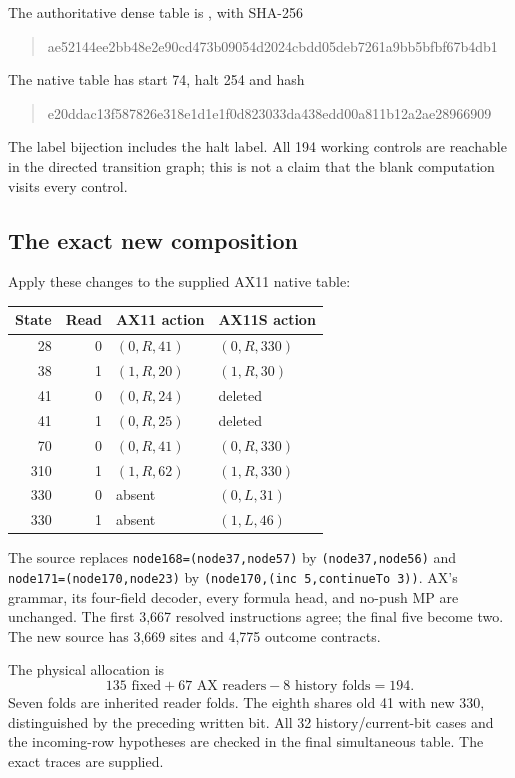 \documentclass[11pt,letterpaper]{article}
\begin{document}
The authoritative dense table is , with SHA-256
\begin{quote}\small\ttfamily
ae52144ee2bb48e2e90cd473b09054d2024cbdd05deb7261a9bb5bfbf67b4db1
\end{quote}
The native table has start 74, halt 254 and hash
\begin{quote}\small\ttfamily
e20ddac13f587826e318e1d1e1f0d823033da438edd00a811b12a2ae28966909
\end{quote}
The label bijection includes the halt label. All 194 working controls are
reachable in the directed transition graph; this is not a claim that the
blank computation visits every control.

\subsection{The exact new composition}
Apply these changes to the supplied AX11 native table:
\begin{center}\begin{tabular}{@{}rrll@{}}
\toprule State&Read&AX11 action&AX11S action\\\midrule
28&0&$(0,R,41)$&$(0,R,330)$\\
38&1&$(1,R,20)$&$(1,R,30)$\\
41&0&$(0,R,24)$&deleted\\
41&1&$(0,R,25)$&deleted\\
70&0&$(0,R,41)$&$(0,R,330)$\\
310&1&$(1,R,62)$&$(1,R,330)$\\
330&0&absent&$(0,L,31)$\\
330&1&absent&$(1,L,46)$\\\bottomrule
\end{tabular}\end{center}
The source replaces \texttt{node168=(node37,node57)} by
\texttt{(node37,node56)} and \texttt{node171=(node170,node23)} by
\texttt{(node170,(inc 5,continueTo 3))}. AX's grammar, its four-field
decoder, every formula head, and no-push MP are unchanged. The first
3,667 resolved instructions agree; the final five become two. The new
source has 3,669 sites and 4,775 outcome contracts.

The physical allocation is
\[
135\text{ fixed}+67\text{ AX readers}-8\text{ history folds}=194.
\]
Seven folds are inherited reader folds. The eighth shares old 41 with
new 330, distinguished by the preceding written bit. All 32
history/current-bit cases and the incoming-row hypotheses are checked
in the final simultaneous table. The exact traces are supplied.
\end{document}
